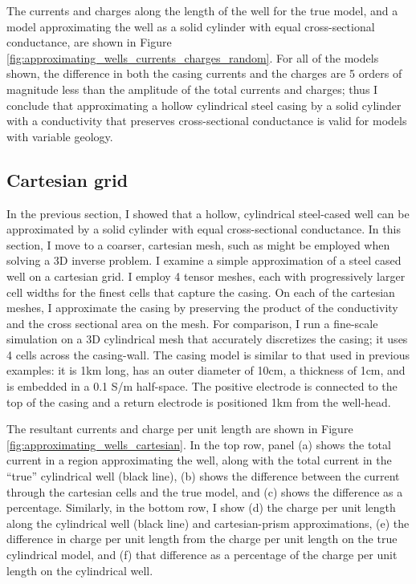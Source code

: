 

The currents and charges along the length of the well for the true model, and a model approximating the well as a solid cylinder with equal cross-sectional conductance, are shown in Figure \ref{fig:approximating_wells_currents_charges_random}. For all of the models shown, the difference in both the casing currents and the charges are 5 orders of magnitude less than the amplitude of the total currents and charges; thus I conclude that approximating a hollow cylindrical steel casing by a solid cylinder with a conductivity that preserves cross-sectional conductance is valid for models with variable geology.



\subsection{Cartesian grid}
\label{sec:approximating-cartesian}

In the previous section, I showed that a hollow, cylindrical steel-cased well can be approximated by a solid cylinder with equal cross-sectional conductance. In this section, I move to a coarser, cartesian mesh, such as might be employed when solving a 3D inverse problem. I examine a simple approximation of a steel cased well on a cartesian grid. I employ 4 tensor meshes, each with progressively larger cell widths for the finest cells that capture the casing. On each of the cartesian meshes, I approximate the casing by preserving the product of the conductivity and the cross sectional area on the mesh. For comparison, I run a fine-scale simulation on a 3D cylindrical mesh that accurately discretizes the casing; it uses 4 cells across the casing-wall. The casing model is similar to that used in previous examples: it is 1km long, has an outer diameter of 10cm, a thickness of 1cm, and is embedded in a 0.1 S/m half-space. The positive electrode is connected to the top of the casing and a return electrode is positioned 1km from the well-head.

The resultant currents and charge per unit length are shown in Figure \ref{fig:approximating_wells_cartesian}. In the top row, panel (a) shows the total current in a region approximating the well, along with the total current in the ``true'' cylindrical well (black line), (b) shows the difference between the current through the cartesian cells and the true model, and (c) shows the difference as a percentage. Similarly, in the bottom row, I show (d) the charge per unit length along the cylindrical well (black line) and cartesian-prism approximations, (e) the difference in charge per unit length from the charge per unit length on the true cylindrical model, and (f) that difference as a percentage of the charge per unit length on the cylindrical well.


